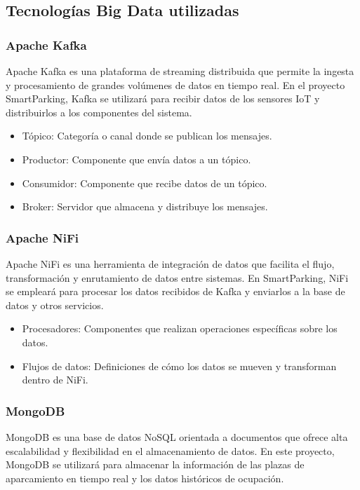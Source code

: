 \documentclass{../../../miPlantilla}
\begin{document}
\subsection{Tecnologías Big Data utilizadas}
\subsubsection{Apache Kafka}
Apache Kafka es una plataforma de streaming distribuida que permite la ingesta y procesamiento de grandes volúmenes de datos en tiempo real.
En el proyecto SmartParking, Kafka se utilizará para recibir datos de los sensores IoT y distribuirlos a los componentes del sistema.

\begin{itemize}
  \item Tópico: Categoría o canal donde se publican los mensajes.
  \item Productor: Componente que envía datos a un tópico.
  \item Consumidor: Componente que recibe datos de un tópico.
  \item Broker: Servidor que almacena y distribuye los mensajes.
\end{itemize}

\subsubsection{Apache NiFi}
Apache NiFi es una herramienta de integración de datos que facilita el flujo, transformación y enrutamiento de datos entre sistemas.
En SmartParking, NiFi se empleará para procesar los datos recibidos de Kafka y enviarlos a la base de datos y otros servicios.

\begin{itemize}
  \item Procesadores: Componentes que realizan operaciones específicas sobre los datos.
  \item Flujos de datos: Definiciones de cómo los datos se mueven y transforman dentro de NiFi.
\end{itemize}

\subsubsection{MongoDB}
MongoDB es una base de datos NoSQL orientada a documentos que ofrece alta escalabilidad y flexibilidad en el almacenamiento de datos.
En este proyecto, MongoDB se utilizará para almacenar la información de las plazas de aparcamiento en tiempo real y los datos históricos
de ocupación.
\end{document}
